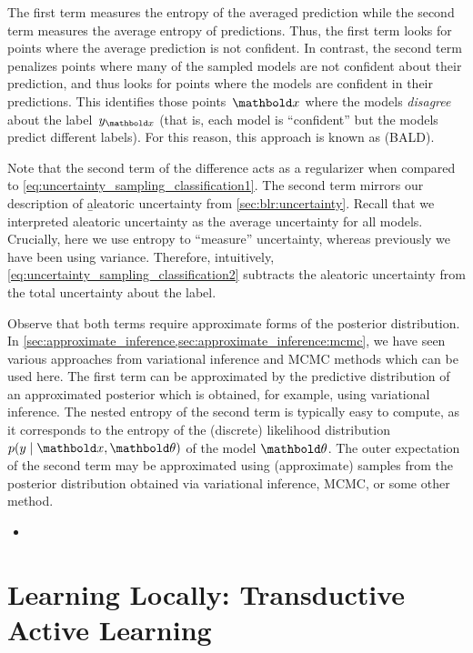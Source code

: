 The first term measures the entropy of the averaged prediction while the second term measures the average entropy of predictions.
Thus, the first term looks for points where the average prediction is not confident.
In contrast, the second term penalizes points where many of the sampled models are not confident about their prediction, and thus looks for points where the models are confident in their predictions.
This identifies those points~$\vx$ where the models \emph{disagree} about the label~$y_{\vx}$ (that is, each model is ``confident'' but the models predict different labels).
For this reason, this approach is known as  (BALD).

Note that the second term of the difference acts as a regularizer when compared to \cref{eq:uncertainty_sampling_classification1}. The second term mirrors our description of \b{aleatoric uncertainty} from \cref{sec:blr:uncertainty}.
Recall that we interpreted aleatoric uncertainty as the average uncertainty for all models.
Crucially, here we use entropy to ``measure'' uncertainty, whereas previously we have been using variance.
Therefore, intuitively, \cref{eq:uncertainty_sampling_classification2} subtracts the aleatoric uncertainty from the total uncertainty about the label.

Observe that both terms require approximate forms of the posterior distribution.
In \cref{sec:approximate_inference,sec:approximate_inference:mcmc}, we have seen various approaches from variational inference and MCMC methods which can be used here.
The first term can be approximated by the predictive distribution of an approximated posterior which is obtained, for example, using variational inference.
The nested entropy of the second term is typically easy to compute, as it corresponds to the entropy of the (discrete) likelihood distribution $p(y \mid \vx, \vtheta)$ of the model $\vtheta$.
The outer expectation of the second term may be approximated using (approximate) samples from the posterior distribution obtained via variational inference, MCMC, or some other method.

\begin{oreadings}
  \begin{itemize}
    \item {}
  \end{itemize}
\end{oreadings}

\section{Learning Locally: Transductive Active Learning}

